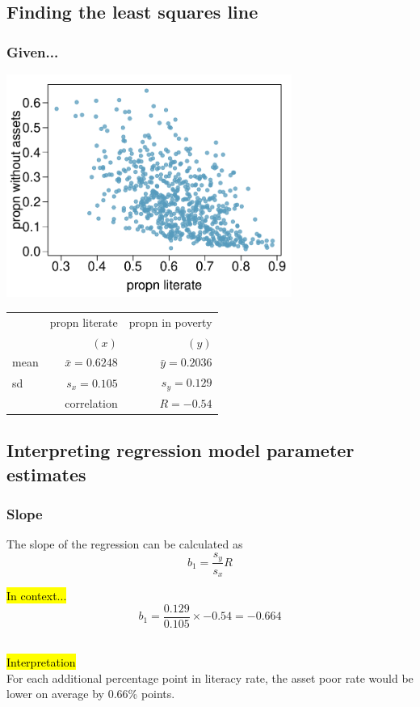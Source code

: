 \documentclass[notes,11pt, aspectratio=169]{beamer}
\begin{document}

\subsection{Finding the least squares line}


\begin{frame}
\frametitle{Given...}

{
\begin{center}
\includegraphics[width=0.7\textwidth]{graphs/l08f01}
\end{center}
}
{
\begin{tabular}{l r r}
\hline
		& propn literate		& propn in poverty \\
		& $(x)$			& $(y)$ \\
\hline
mean	& $\bar{x} = 0.6248 $	& $\bar{y} = 0.2036$  \\
sd		& $s_x = 0.105$		& $s_y = 0.129$ \\
\hline
		& correlation		& $R = -0.54$ \\
\hline
\end{tabular}
}

\end{frame}


\subsection{Interpreting regression model parameter estimates}


\begin{frame}
\frametitle{Slope}

{The slope of the regression can be calculated as 
\[ b_1 = \frac{s_y}{s_x} R \]
}

\pause

\hl{In context...}
\[ b_1 = \frac{0.129}{0.105} \times -0.54 = -0.664 \]

\pause
$\:$ \\
\hl{Interpretation} \\
For each additional percentage point in literacy rate, the asset poor rate would be lower on average by 0.66\% points.

\end{frame}
\end{document}
